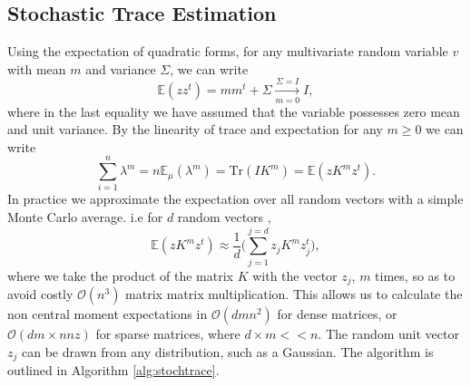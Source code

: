 \documentclass[letterpaper]{article} %
\begin{document}
\subsection{Stochastic Trace Estimation}
\label{stochastictrace}
Using the expectation of quadratic forms, for any multivariate random variable $v$ with mean $m$ and variance $\Sigma$, we can write 
\begin{equation}
\mathbb{E}(zz^{t}) = mm^{t}+\Sigma \xrightarrow[m = 0]{\Sigma = I} I,
\end{equation}
where in the last equality we have assumed that the variable possesses zero mean and unit variance. By the linearity of trace and expectation for any $m\geq 0$ we can write
\begin{equation}
\sum_{i=1}^{n}\lambda^{m} = n\mathbb{E}_{\mu}(\lambda^{m}) = \text{Tr}(IK^{m}) = \mathbb{E}(zK^{m}z^{t}).
\end{equation}
In practice we approximate the expectation over all random vectors with a simple Monte Carlo average. i.e for $d$ random vectors ,
\begin{equation}
\mathbb{E}(zK^{m}z^{t}) \approx \frac{1}{d}\bigg(\sum_{j=1}^{j=d}z_{j}K^{m}z_{j}^{t} \bigg),
\end{equation}
where we take the product of the matrix $K$ with the vector $z_{j}$, $m$ times, so as to avoid costly $\mathcal{O}(n^{3})$ matrix matrix multiplication. This allows us to calculate the non central moment expectations in $\mathcal{O}(dmn^{2})$ for dense matrices, or $\mathcal{O}(dm\times nnz)$ for sparse matrices, where $d\times m << n$. The random unit vector $z_{j}$ can be drawn from any distribution, such as a Gaussian. The algorithm is outlined in Algorithm \ref{alg:stochtrace}.






\end{document}
